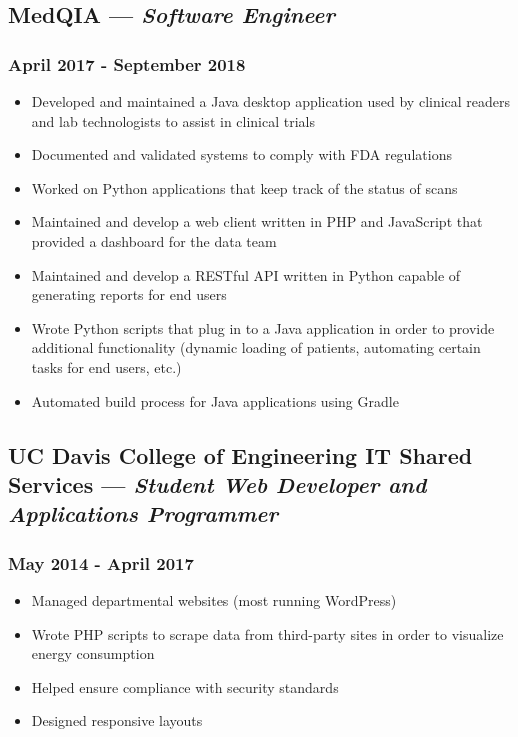 \documentclass{article}
\begin{document}
\begin{minipage}[t]{.6\textwidth}
\subsection*{MedQIA --- \textit{Software Engineer}}
\subsubsection*{April 2017 - September 2018}
\begin{itemize}
    \item Developed and maintained a Java desktop application used by clinical readers and lab technologists to assist in clinical trials
    \item Documented and validated systems to comply with FDA regulations
    \item Worked on Python applications that keep track of the status of scans
    \item Maintained and develop a web client written in PHP and JavaScript that provided a dashboard for the data team
    \item Maintained and develop a RESTful API written in Python capable of generating reports for end users
    \item Wrote Python scripts that plug in to a Java application in order to provide additional functionality (dynamic loading of patients, automating certain tasks for end users, etc.)
    \item Automated build process for Java applications using Gradle
\end{itemize}
\subsection*{UC Davis College of Engineering IT Shared Services --- \textit{Student Web Developer and Applications Programmer}}
\subsubsection*{May 2014 - April 2017}
\begin{itemize}
    \item Managed departmental websites (most running WordPress)
    \item Wrote PHP scripts to scrape data from third-party sites in order to visualize energy consumption
    \item Helped ensure compliance with security standards
    \item Designed responsive layouts
\end{itemize}
\end{minipage}
\end{document}
